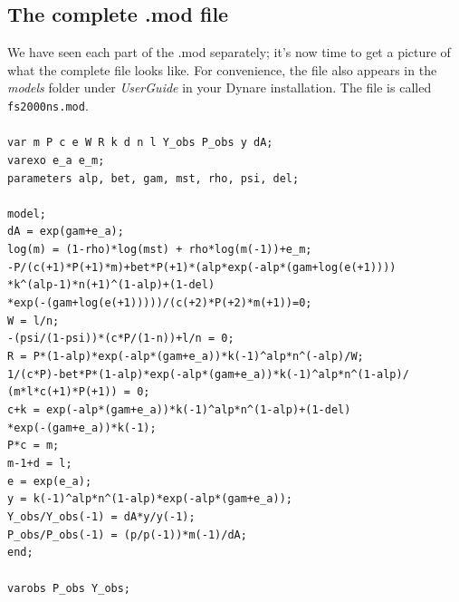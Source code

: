 \subsection{The complete .mod file}
We have seen each part of the .mod separately; it's now time to get a picture of what the complete file looks like. For convenience, the file also appears in the \textsl{models} folder under \textsl{UserGuide} in your Dynare installation. The file is called \texttt{fs2000ns.mod}. \\
\\
\texttt{var m P c e W R k d n l Y\_obs P\_obs y dA; \\
varexo e\_a e\_m;\\
parameters alp, bet, gam, mst, rho, psi, del;\\
\\
model;\\
dA = exp(gam+e\_a);\\
log(m) = (1-rho)*log(mst) + rho*log(m(-1))+e\_m;\\
-P/(c(+1)*P(+1)*m)+bet*P(+1)*(alp*exp(-alp*(gam+log(e(+1))))\\
*k\textasciicircum (alp-1)*n(+1)\textasciicircum (1-alp)+(1-del)\\
*exp(-(gam+log(e(+1)))))/(c(+2)*P(+2)*m(+1))=0;\\
W = l/n;\\
-(psi/(1-psi))*(c*P/(1-n))+l/n = 0;\\
R = P*(1-alp)*exp(-alp*(gam+e\_a))*k(-1)\textasciicircum alp*n\textasciicircum (-alp)/W;\\
1/(c*P)-bet*P*(1-alp)*exp(-alp*(gam+e\_a))*k(-1)\textasciicircum alp*n\textasciicircum (1-alp)/\\(m*l*c(+1)*P(+1)) = 0;\\
c+k = exp(-alp*(gam+e\_a))*k(-1)\textasciicircum alp*n\textasciicircum (1-alp)+(1-del)\\*exp(-(gam+e\_a))*k(-1);\\
P*c = m;\\
m-1+d = l;\\
e = exp(e\_a);\\
y = k(-1)\textasciicircum alp*n\textasciicircum (1-alp)*exp(-alp*(gam+e\_a));\\
Y\_obs/Y\_obs(-1) = dA*y/y(-1);\\
P\_obs/P\_obs(-1) = (p/p(-1))*m(-1)/dA;\\
end;\\
\\
varobs P\_obs Y\_obs;\\
\\
}
